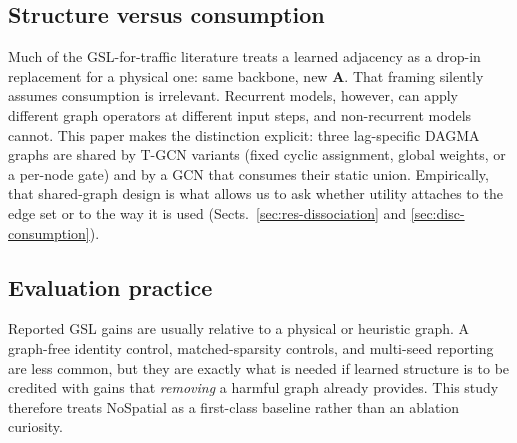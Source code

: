 \subsection{Structure versus consumption}\label{sec:bg-consumption}

Much of the GSL-for-traffic literature treats a learned adjacency as a
drop-in replacement for a physical one: same backbone, new $\mathbf{A}$.
That framing silently assumes consumption is irrelevant. Recurrent models,
however, can apply different graph operators at different input steps, and
non-recurrent models cannot. This paper makes the distinction explicit:
three lag-specific DAGMA graphs are shared by T-GCN variants (fixed cyclic
assignment, global weights, or a per-node gate) and by a GCN that consumes
their static union. Empirically, that shared-graph design is what allows us
to ask whether utility attaches to the edge set or to the way it is used
(Sects.~\ref{sec:res-dissociation} and \ref{sec:disc-consumption}).

\subsection{Evaluation practice}\label{sec:bg-eval}

Reported GSL gains are usually relative to a physical or heuristic graph.
A graph-free identity control, matched-sparsity controls, and multi-seed
reporting are less common, but they are exactly what is needed if learned
structure is to be credited with gains that \emph{removing} a harmful graph
already provides. This study therefore treats NoSpatial as a first-class
baseline rather than an ablation curiosity.
